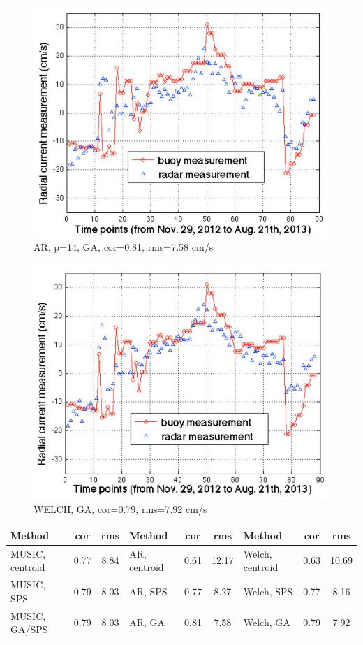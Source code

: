 \documentclass[12pt]{beamer}
\begin{document}
\begin{frame}
  \begin{figure}[htbp]
      \includegraphics[width=0.5\linewidth]{figs/h.jpg}
       \caption{AR, p=14, GA, cor=0.81, rms=7.58
       cm/s}
  \end{figure}
\end{frame}
\begin{frame}
  \begin{figure}[htbp]
      \includegraphics[width=0.5\linewidth]{figs/i.jpg}
       \caption{WELCH, GA, cor=0.79, rms=7.92 cm/s}
  \end{figure}
\end{frame}
\begin{frame}{}
  \begin{table}
    \begin{tabular}{|p{1.5cm}cc|p{1.5cm}cc|p{1.5cm}cc|}
      \hline
      Method&cor&rms&Method&cor&rms&Method&cor&rms\\
      \hline
      \hline
      MUSIC, centroid&0.77&8.84& AR, centroid&0.61&12.17&Welch, centroid&0.63&10.69\\
      \hline
      MUSIC, SPS& 0.79&8.03&AR, SPS&0.77&8.27&Welch, SPS&0.77&8.16\\ \hline
      MUSIC, GA/SPS&0.79&8.03&AR, GA&0.81&7.58&Welch, GA &0.79& 7.92\\
      \hline
    \end{tabular}
  \end{table}
\end{frame}
\end{document}
